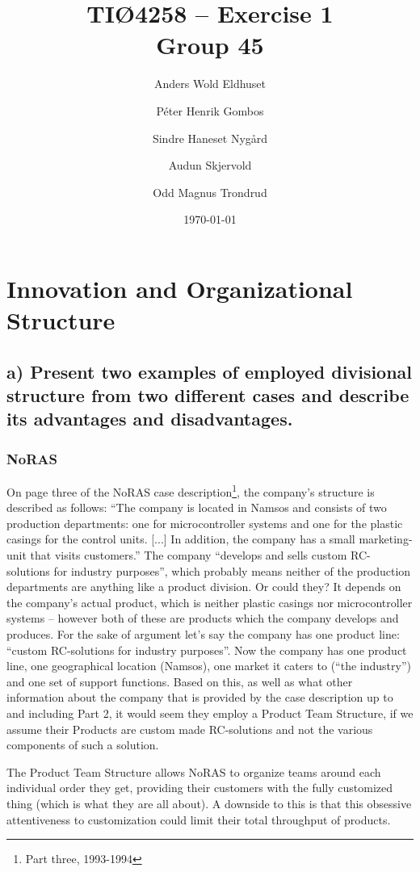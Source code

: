 \documentclass[a4paper]{article}
\title{TIØ4258 -- Exercise 1 \\ Group 45}
\author{
    Anders Wold Eldhuset \and
    Péter Henrik Gombos \and
    Sindre Haneset Nygård \and
    Audun Skjervold \and
    Odd Magnus Trondrud
}
\date{\today}
\begin{document}
    \maketitle
    \newpage
    \setcounter{secnumdepth}{2}

    \section{Innovation and Organizational Structure} %


    \subsection*{a) Present two examples of employed divisional structure from
    two different cases and describe its advantages and disadvantages.}


    \subsubsection{NoRAS} On page three of the NoRAS case
    description\footnote{Part three, 1993-1994}, the company's structure is
    described as follows: ``The company is located in Namsos and consists
    of two production departments: one for microcontroller systems and one
    for the plastic casings for the control units. [...] In addition, the
    company has a small marketing-unit that visits customers.'' The company
    ``develops and sells custom RC-solutions for industry purposes'', which
    probably means neither of the production departments are anything like
    a product division. Or could they? It depends on the company's actual
    product, which is neither plastic casings nor microcontroller systems
    -- however both of these are products which the company develops and
    produces. For the sake of argument let's say the company has one product
    line: ``custom RC-solutions for industry purposes''. Now the company has
    one product line, one geographical location (Namsos), one market it caters
    to (``the industry'') and one set of support functions. Based on this, as
    well as what other information about the company that is provided by the
    case description up to and including Part 2, it would seem they employ
    a Product Team Structure, if we assume their Products are custom made
    RC-solutions and not the various components of such a solution.


    The Product Team Structure allows NoRAS to organize teams around each
    individual order they get, providing their customers with the fully
    customized thing (which is what they are all about).
    A downside to this is that this obsessive attentiveness to customization
    could limit their total throughput of products.
\end{document}
